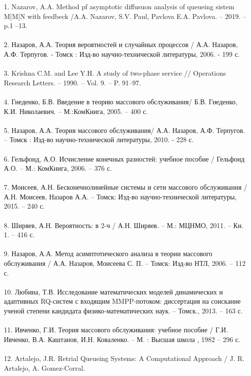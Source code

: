 1. Nazarov, A.A. Method pf asymptotic diffusuon analysis of queueing sistem M|M|N with feedbeck /A.A. Nazarov, S.V. Paul, Pavlova E.A. Pavlova. – 2019. – p.1 –13.\\
\\
2. Назаров, А.А. Теория вероятностей и случайных процессов / А.А. Назаров,
А.Ф. Терпугов. - Томск : Изд-во научно-технической литературы, 2006. -
199 с. \\
\\
3. Krishna C.M. and Lee Y.H. A study of two-phase service //
Operations Research Letters. – 1990. – Vol. 9. – P. 91–97.\\
\\
4. Гнеденко, Б.В.  Введение в теорию массового обслуживания/ Б.В. Гнеденко, К.И. Николаевич. – М.:КомКнига, 2005. – 400 с.\\
\\
5. Назаров, А.А. Теория массового обслуживания/ А.А. Назаров,
А.Ф. Терпугов. – Томск : Изд-во научно-технической литературы, 2010. -
228 с. \\
\\
6. Гельфонд, А.О. Исчисление конечных разностей: учебное пособие / Гельфонд А.О. – М.: КомКнига, 2006. – 376 с.\\
\\
7. Моисеев, А.Н. Бесконечнолинейные системы и сети массового обслуживания / А.Н. Моисеев, Назаров А.А. – Томск: Изд-во научно-технической литературы, 2015. – 240 с.\\
\\
8.  Ширяев, А.Н. Вероятность: в 2-ч / А.Н. Ширяев. – М.: МЦНМО, 2011. – Кн. 1. – 416 с.\\
\\
9.  Назаров, А.А. Метод асимптотического анализа в теории массового обслуживания / А.А. Назаров, Моисеева С. П. – Томск: Изд-во НТЛ, 2006. – 112 с.\\
\\
10. Любина, Т.В. Исследование математических моделей динамических и адаптивных RQ-систем с входящим MMPP-потоком: диссертация на соискание ученой степени кандидата физико-математических наук. – Томск., 2013. – 163 с.\\
\\
11. Ивченко, Г.И. Теория массового обслуживания: учебное пособие / Г.И. Ивченко, В.А. Каштанов, И.Н. Коваленко. – 	
М. : Высшая школа , 1982 – 296 с.\\
\\
12. Artalejo, J.R. Retrial Queueing Systems: A Computational Approach / J. R. Artalejo, A. Gomez-Corral.
